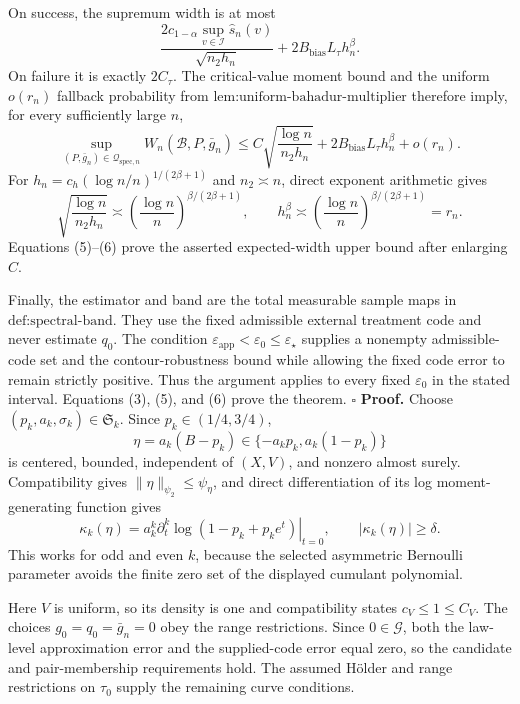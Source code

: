 On success, the supremum width is at most
\[
 \frac{2\widehat c_{1-\alpha}\sup_{v\in\mathcal I}\widehat s_n(v)}
 {\sqrt{n_2h_n}}
 +2B_{\mathrm{bias}}L_\tau h_n^\beta. \tag{4}
\]
On failure it is exactly \(2C_\tau\).  The critical-value moment bound and the uniform \(o(r_n)\) fallback probability from \(\text{lem:uniform-bahadur-multiplier}\) therefore imply, for every sufficiently large \(n\),
\[
 \sup_{(P,\bar g_n)\in\mathcal Q_{\mathrm{spec},n}}
 W_n(\mathcal B,P,\bar g_n)
 \le C\sqrt{\frac{\log n}{n_2h_n}}
 +2B_{\mathrm{bias}}L_\tau h_n^\beta+o(r_n). \tag{5}
\]
For \(h_n=c_h(\log n/n)^{1/(2\beta+1)}\) and \(n_2\asymp n\), direct exponent arithmetic gives
\[
 \sqrt{\frac{\log n}{n_2h_n}}
 \asymp
 \left(\frac{\log n}{n}\right)^{\beta/(2\beta+1)},
 \qquad
 h_n^\beta
 \asymp
 \left(\frac{\log n}{n}\right)^{\beta/(2\beta+1)}
 =r_n. \tag{6}
\]
Equations (5)--(6) prove the asserted expected-width upper bound after enlarging \(C\).

Finally, the estimator and band are the total measurable sample maps in \(\text{def:spectral-band}\).  They use the fixed admissible external treatment code and never estimate \(q_0\).  The condition \(\varepsilon_{\mathrm{app}}<\varepsilon_0\le\varepsilon_\star\) supplies a nonempty admissible-code set and the contour-robustness bound while allowing the fixed code error to remain strictly positive.  Thus the argument applies to every fixed \(\varepsilon_0\) in the stated interval.  Equations (3), (5), and (6) prove the theorem. \(\square\)
\textbf{Proof.}
Choose \((p_k,a_k,\sigma_k)\in\mathfrak S_k\).  Since \(p_k\in(1/4,3/4)\),
\[
 \eta=a_k(B-p_k)\in\{-a_kp_k,a_k(1-p_k)\}
\]
is centered, bounded, independent of \((X,V)\), and nonzero almost surely.  Compatibility gives \(\|\eta\|_{\psi_2}\le\psi_\eta\), and direct differentiation of its log moment-generating function gives
\[
 \kappa_k(\eta)=a_k^k\left.\partial_t^k\log(1-p_k+p_ke^t)\right|_{t=0},
 \qquad |\kappa_k(\eta)|\ge\delta. \tag{1}
\]
This works for odd and even \(k\), because the selected asymmetric Bernoulli parameter avoids the finite zero set of the displayed cumulant polynomial.

Here \(V\) is uniform, so its density is one and compatibility states \(c_V\le1\le C_V\).  The choices \(g_0=q_0=\bar g_n=0\) obey the range restrictions.  Since \(0\in\mathcal G\), both the law-level approximation error and the supplied-code error equal zero, so the candidate and pair-membership requirements hold.  The assumed H\"older and range restrictions on \(\tau_0\) supply the remaining curve conditions.

